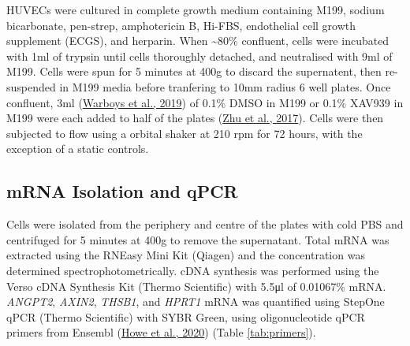 \documentclass[
  12pt,
]{article}
\begin{document}
HUVECs were cultured in complete growth medium containing M199, sodium bicarbonate, pen-strep, amphotericin B, Hi-FBS, endothelial cell growth supplement (ECGS), and herparin. When \textasciitilde80\% confluent, cells were incubated with 1ml of trypsin until cells thoroughly detached, and neutralised with 9ml of M199. Cells were spun for 5 minutes at 400g to discard the supernatent, then re-suspended in M199 media before tranfering to 10mm radius 6 well plates. Once confluent, 3ml (\protect\hyperlink{ref-Warboys2019}{Warboys et al., 2019}) of 0.1\% DMSO in M199 or 0.1\% XAV939 in M199 were each added to half of the plates (\protect\hyperlink{ref-Zhu2017}{Zhu et al., 2017}). Cells were then subjected to flow using a orbital shaker at 210 rpm for 72 hours, with the exception of a static controls.

\hypertarget{mrna-isolation-and-qpcr}{%
\subsection{mRNA Isolation and qPCR}\label{mrna-isolation-and-qpcr}}

Cells were isolated from the periphery and centre of the plates with cold PBS and centrifuged for 5 minutes at 400g to remove the supernatant. Total mRNA was extracted using the RNEasy Mini Kit (Qiagen) and the concentration was determined spectrophotometrically. cDNA synthesis was performed using the Verso cDNA Synthesis Kit (Thermo Scientific) with 5.5μl of 0.01067\% mRNA. \emph{ANGPT2}, \emph{AXIN2}, \emph{THSB1}, and \emph{HPRT1} mRNA was quantified using StepOne qPCR (Thermo Scientific) with SYBR Green, using oligonucleotide qPCR primers from Ensembl (\protect\hyperlink{ref-howe2020}{Howe et al., 2020}) (Table \ref{tab:primers}).
\end{document}

